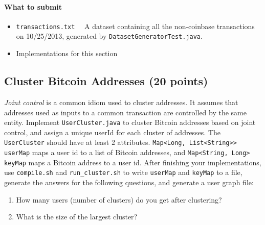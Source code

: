 \documentclass[letterpaper,12pt]{report}
\begin{document}
\paragraph{What to submit} 
\begin{itemize}
	\item \texttt{transactions.txt} \ \  A dataset containing all the non-coinbase transactions on 10/25/2013, generated by \texttt{DatasetGeneratorTest.java}.
	\item Implementations for this section
\end{itemize}

\subsection{Cluster Bitcoin Addresses (20 points)} \label{subsec:cluster}
\textit{Joint control} is a common idiom used to cluster addresses. It assumes that addresses used as inputs to a common transaction are controlled by the same entity. Implement \texttt{UserCluster.java} to cluster Bitcoin addresses based on joint control, and assign a unique userId for each cluster of addresses. The \texttt{UserCluster} should have at least 2 attributes. \texttt{Map<Long, List<String>> userMap} maps a user id to a list of Bitcoin addresses, and \texttt{Map<String, Long> keyMap} maps a Bitcoin address to a user id. After finishing your implementations, use \texttt{compile.sh} and \texttt{run\_cluster.sh} to write \texttt{userMap} and \texttt{keyMap} to a file, generate the answers for the following questions, and generate a user graph file:
\begin{enumerate}
	\item How many users (number of clusters) do you get after clustering?
	\item What is the size of the largest cluster? 
\end{enumerate}
 
\end{document}
